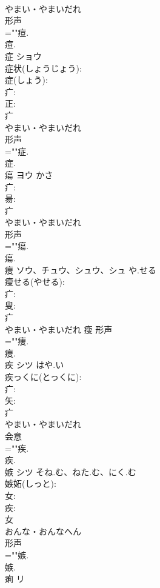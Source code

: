 \documentclass[8pt]{extreport}
\begin{document}
\begin{CJK}{UTF8}{min}
\\	やまい・やまいだれ	
\\	形声 
\\	=""痘.
\\	痘.
\\	症	ショウ			
\\	症状(しょうじょう): 
\\	症(しょう): 
\\	疒: 
\\	正: 
\\	疒	
\\	やまい・やまいだれ	
\\	形声 
\\	=""症.
\\	症.
\\	瘍	ヨウ	かさ		
\\	疒: 
\\	昜: 
\\	疒	
\\	やまい・やまいだれ	
\\	形声 
\\	=""瘍.
\\	瘍.
\\	痩	ソウ、チュウ、シュウ、シュ	や.せる		
\\	痩せる(やせる): 
\\	疒: 
\\	叟: 
\\	疒	
\\	やまい・やまいだれ	瘦	形声 
\\	=""痩.
\\	痩.
\\	疾	シツ	はや.い		
\\	疾っくに(とっくに): 
\\	疒: 
\\	矢: 
\\	疒	
\\	やまい・やまいだれ	
\\	会意 
\\	=""疾.
\\	疾.
\\	嫉	シツ	そね.む、ねた.む、にく.む		
\\	嫉妬(しっと): 
\\	女: 
\\	疾: 
\\	女	
\\	おんな・おんなへん	
\\	形声 
\\	=""嫉.
\\	嫉.
\\	痢	リ			

\end{CJK}
\end{document}
